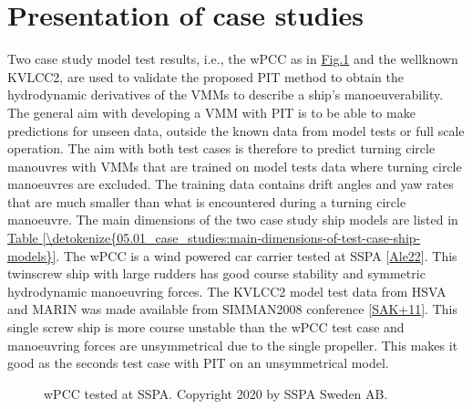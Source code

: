 \documentclass[review]{elsarticle}
\let\sphinxpxdimen\pdfpxdimen\else\newdimen\sphinxpxdimen
\begin{document}
\section{Presentation of case studies}
\label{\detokenize{05.01_case_studies:case-studies}}\label{\detokenize{05.01_case_studies:id1}}\label{\detokenize{05.01_case_studies::doc}} 
Two case study model test results, i.e., the wPCC as in \hyperref[\detokenize{05.01_case_studies:wpcc-mdl}]{Fig.\@ \ref{\detokenize{05.01_case_studies:wpcc-mdl}}} and the well\sphinxhyphen{}known KVLCC2, are used to validate the proposed PIT method to obtain the hydrodynamic derivatives of the VMMs to describe a ship’s manoeuverability. The general aim with developing a VMM with PIT is to be able to make predictions for unseen data, outside the known data from model tests or full scale operation. The aim with both test cases is therefore to predict turning circle manouvres with VMMs that are trained on model tests data where turning circle manoeuvres are excluded. The training data contains drift angles and yaw rates that are much smaller than what is encountered during a turning circle manoeuvre.
The main dimensions of the two case study ship models are listed in \hyperref[\detokenize{05.01_case_studies:main-dimensions-of-test-case-ship-models}]{Table \ref{\detokenize{05.01_case_studies:main-dimensions-of-test-case-ship-models}}}. The wPCC is a wind powered car carrier tested at SSPA {[}\hyperlink{cite.bibligraphy:id86}{Ale22}{]}. This twin\sphinxhyphen{}screw ship with large rudders has good course stability and symmetric hydrodynamic manoeuvring forces. The KVLCC2 model test data from HSVA and MARIN was made available from SIMMAN2008 conference {[}\hyperlink{cite.bibligraphy:id79}{SAK+11}{]}. This single screw ship is more course unstable than the wPCC test case and manoeuvring forces are unsymmetrical due to the single propeller. This makes it good as the seconds test case with PIT on an unsymmetrical model.

\begin{figure}[H]
\centering
\capstart

\noindent\sphinxincludegraphics[height=150\sphinxpxdimen]{{wpcc_mdl}.png}
\caption{wPCC tested at SSPA. Copyright 2020 by SSPA Sweden AB.}\label{\detokenize{05.01_case_studies:wpcc-mdl}}\end{figure}
\end{document}

